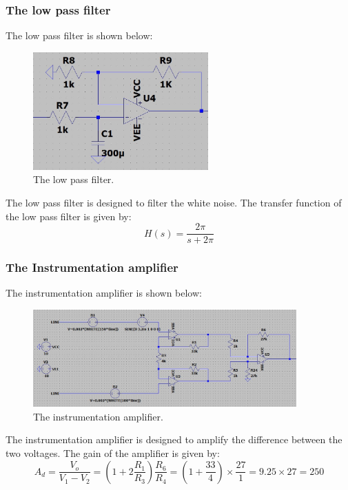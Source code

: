 \subsubsection{The low pass filter}
The low pass filter is shown below:
\begin{figure}[H]
    \centering
    \includegraphics[width=0.6\textwidth]{../Report/Figures/2.CircuitDesign/LowPassFilter.jpg}
    \caption{The low pass filter.}
\end{figure}
The low pass filter is designed to filter the white noise. The transfer function of the low pass filter is given by:
\begin{equation}
    H(s) = \frac{2 \pi}{s + 2 \pi}
\end{equation}

\subsubsection{The Instrumentation amplifier}
The instrumentation amplifier is shown below:
\begin{figure}[H]
    \centering
    \includegraphics[width=0.9\textwidth]{../Report/Figures/2.CircuitDesign/InstrumentationAmplifier.jpg}
    \caption{The instrumentation amplifier.}
\end{figure}
The instrumentation amplifier is designed to amplify the difference between the two voltages. The gain of the amplifier is given by:
\begin{equation}
    A_{d} = \frac{V_{o}}{V_{1} - V_{2}} = (1 + 2 \frac{R_{1}}{R_{3}}) \frac{R_{6}}{R_{4}} = (1+\frac{33}{4})\times \frac{27}{1} = 9.25 \times 27 = 250
\end{equation}


